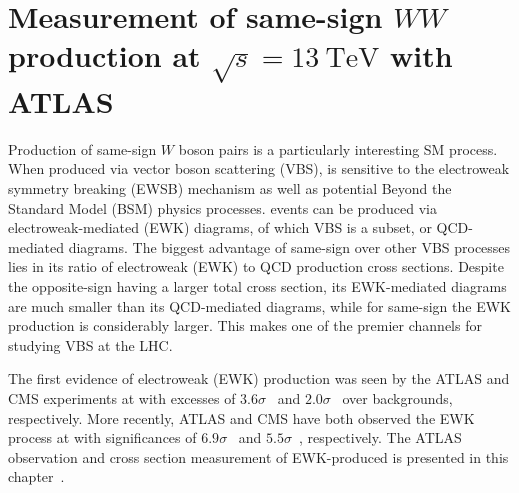 \chapter[Measurement of same-sign $WW$ production at $\sqrt{s} = 13~\mathrm{TeV}$ with ATLAS][Measurement of same-sign $WW$ production at $\sqrt{s} = 13~\mathrm{TeV}$ with ATLAS]{Measurement of same-sign $WW$ production at $\sqrt{s} = 13~\mathrm{TeV}$ with ATLAS}
\label{ch:ssww13tev}
\setcounter{subsection}{0}

Production of same-sign $W$ boson pairs is a particularly interesting SM process.
When produced via vector boson scattering (VBS), \ssww is sensitive to the electroweak symmetry breaking (EWSB) mechanism as well as potential Beyond the Standard Model (BSM) physics processes.
\ssww events can be produced via electroweak-mediated (EWK) diagrams, of which VBS is a subset, or QCD-mediated diagrams. 
The biggest advantage of same-sign \ssww over other VBS processes lies in its ratio of electroweak (EWK) to QCD production cross sections.
Despite the opposite-sign \osww having a larger total cross section, its EWK-mediated diagrams are much smaller than its QCD-mediated diagrams, while for same-sign \sswwnojj the EWK production is considerably larger.
This makes \ssww one of the premier channels for studying VBS at the LHC.

The first evidence of electroweak (EWK) \ssww production was seen by the ATLAS and CMS experiments at  with excesses of $3.6\sigma$~\cite{2014.ssww-8tev-atlas} and $2.0\sigma$~\cite{2015.ssww-8tev-cms} over backgrounds, respectively.
More recently, ATLAS and CMS have both observed the EWK process at  with significances of $6.9\sigma$~\cite{2018.ssww-13tev-atlas-conf} and $5.5\sigma$~\cite{2017.ssww-13tev-cms}, respectively.
The ATLAS  observation and cross section measurement of EWK-produced \ssww is presented in this chapter~\cite{2018.ssww-13tev-atlas-conf, 2018.ssww-13tev-atlas-support}.



